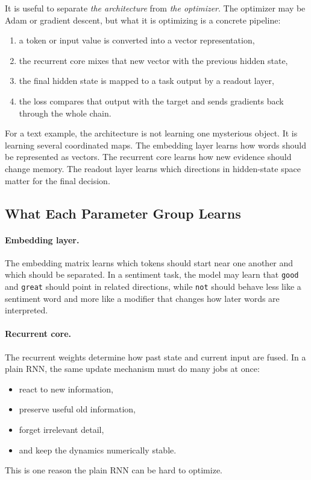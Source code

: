 \documentclass[12pt,a4paper]{article}
\begin{document}
It is useful to separate \emph{the architecture} from \emph{the optimizer}. The optimizer may be Adam or gradient descent, but what it is optimizing is a concrete pipeline:

\begin{enumerate}
  \item a token or input value is converted into a vector representation,
  \item the recurrent core mixes that new vector with the previous hidden state,
  \item the final hidden state is mapped to a task output by a readout layer,
  \item the loss compares that output with the target and sends gradients back through the whole chain.
\end{enumerate}

For a text example, the architecture is not learning one mysterious object. It is learning several coordinated maps. The embedding layer learns how words should be represented as vectors. The recurrent core learns how new evidence should change memory. The readout layer learns which directions in hidden-state space matter for the final decision.

\subsection{What Each Parameter Group Learns}

\paragraph{Embedding layer.}
The embedding matrix learns which tokens should start near one another and which should be separated. In a sentiment task, the model may learn that \texttt{good} and \texttt{great} should point in related directions, while \texttt{not} should behave less like a sentiment word and more like a modifier that changes how later words are interpreted.

\paragraph{Recurrent core.}
The recurrent weights determine how past state and current input are fused. In a plain RNN, the same update mechanism must do many jobs at once:
\begin{itemize}
  \item react to new information,
  \item preserve useful old information,
  \item forget irrelevant detail,
  \item and keep the dynamics numerically stable.
\end{itemize}
This is one reason the plain RNN can be hard to optimize.
\end{document}
